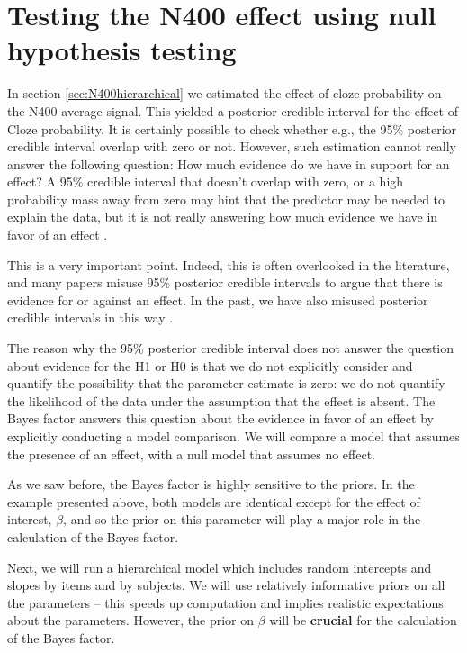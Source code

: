 \documentclass[12pt,]{krantz}
\theoremstyle{definition}
\theoremstyle{definition}
\theoremstyle{definition}
\theoremstyle{remark}
\begin{document}
\section{Testing the N400 effect using null hypothesis
testing}\label{sec:N400BF}

In section \ref{sec:N400hierarchical} we estimated the effect of cloze
probability on the N400 average signal. This yielded a posterior
credible interval for the effect of Cloze probability. It is certainly
possible to check whether e.g., the 95\% posterior credible interval
overlap with zero or not. However, such estimation cannot really answer
the following question: How much evidence do we have in support for an
effect? A 95\% credible interval that doesn't overlap with zero, or a
high probability mass away from zero may hint that the predictor may be
needed to explain the data, but it is not really answering how much
evidence we have in favor of an effect \citep[for discussion,
see][]{Royall, wagenmakersPrinciplePredictiveIrrelevance2019, rouder2018bayesian}.

This is a very important point. Indeed, this is often overlooked in the
literature, and many papers misuse 95\% posterior credible intervals to
argue that there is evidence for or against an effect. In the past, we
have also misused posterior credible intervals in this way \citep[and
even recommended this incorrect interpretation in, for
example,][]{NicenboimVasishth2016}.

The reason why the 95\% posterior credible interval does not answer the
question about evidence for the H1 or H0 is that we do not explicitly
consider and quantify the possibility that the parameter estimate is
zero: we do not quantify the likelihood of the data under the assumption
that the effect is absent. The Bayes factor answers this question about
the evidence in favor of an effect by explicitly conducting a model
comparison. We will compare a model that assumes the presence of an
effect, with a null model that assumes no effect.

As we saw before, the Bayes factor is highly sensitive to the priors. In
the example presented above, both models are identical except for the
effect of interest, \(\beta\), and so the prior on this parameter will
play a major role in the calculation of the Bayes factor.

Next, we will run a hierarchical model which includes random intercepts
and slopes by items and by subjects. We will use relatively informative
priors on all the parameters -- this speeds up computation and implies
realistic expectations about the parameters. However, the prior on
\(\beta\) will be \textbf{crucial} for the calculation of the Bayes
factor.
\end{document}
